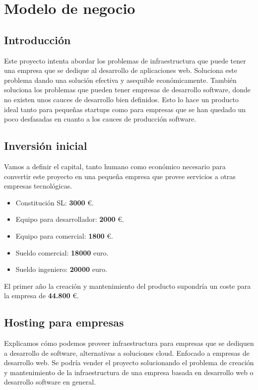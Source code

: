 \chapter {Modelo de negocio}

\section{Introducción}
	\begin{text}
		Este proyecto intenta abordar los problemas de infraestructura que puede tener una empresa que se dedique al desarrollo de aplicaciones web. Soluciona este problema dando una solución efectiva y asequible económicamente. También soluciona los problemas que pueden tener empresas de desarrollo software, donde no existen unos cauces de desarrollo bien definidos. Esto lo hace un producto ideal tanto para pequeñas startups como para empresas que se han quedado un poco desfasadas en cuanto a los cauces de producción software.
	\end{text}

\section{Inversión inicial}
	\begin{text}
		Vamos a definir el capital, tanto humano como económico necesario para convertir este proyecto en una pequeña empresa que provee servicios a otras empresas tecnológicas.
		
		\begin{itemize}
			\item Constitución SL: \textbf{3000} \euro.
			\item Equipo para desarrollador: \textbf{2000} \euro.
			\item Equipo para comercial: \textbf{1800} \euro.
			\item Sueldo comercial: \textbf{18000} euro.
			\item Sueldo ingeniero: \textbf{20000} euro.
		\end{itemize}
	
		El primer año la creación y mantenimiento del producto supondría un coste para la empresa de \textbf{44.800} \euro.
	\end{text}


\section{Hosting para empresas}
	\begin{text}
		Explicamos cómo podemos proveer infraestructura para empresas que se dediquen a desarrollo de software, alternativas a soluciones cloud.
		Enfocado a empresas de desarrollo web. Se podría vender el proyecto solucionando el problema de creación y mantenimiento de la infraestructura de una empresa basada en desarrollo web o desarrollo software en general.  
	\end{text}

